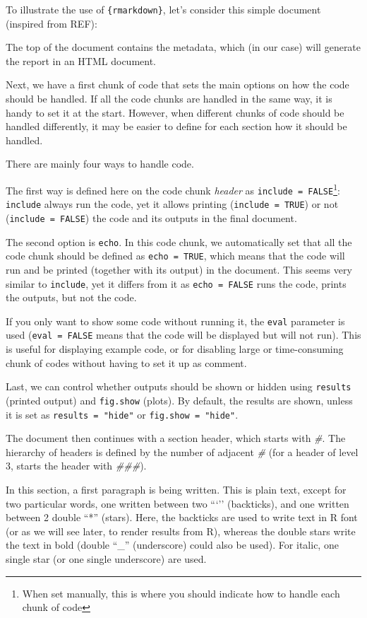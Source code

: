 \documentclass[
]{krantz}
\begin{document}
To illustrate the use of \texttt{\{rmarkdown\}}, let's consider this simple document (inspired from REF):

The top of the document contains the metadata, which (in our case) will generate the report in an HTML document.

Next, we have a first chunk of code that sets the main options on how the code should be handled. If all the code chunks are handled in the same way, it is handy to set it at the start. However, when different chunks of code should be handled differently, it may be easier to define for each section how it should be handled.

There are mainly four ways to handle code.

The first way is defined here on the code chunk \emph{header} as \texttt{include\ =\ FALSE}\footnote{When set manually, this is where you should indicate how to handle each chunk of code}: \texttt{include} always run the code, yet it allows printing (\texttt{include\ =\ TRUE}) or not (\texttt{include\ =\ FALSE}) the code and its outputs in the final document.

The second option is \texttt{echo}. In this code chunk, we automatically set that all the code chunk should be defined as \texttt{echo\ =\ TRUE}, which means that the code will run and be printed (together with its output) in the document. This seems very similar to \texttt{include}, yet it differs from it as \texttt{echo\ =\ FALSE} runs the code, prints the outputs, but not the code.

If you only want to show some code without running it, the \texttt{eval} parameter is used (\texttt{eval\ =\ FALSE} means that the code will be displayed but will not run). This is useful for displaying example code, or for disabling large or time-consuming chunk of codes without having to set it up as comment.

Last, we can control whether outputs should be shown or hidden using \texttt{results} (printed output) and \texttt{fig.show} (plots). By default, the results are shown, unless it is set as \texttt{results\ =\ "hide"} or \texttt{fig.show\ =\ "hide"}.

The document then continues with a section header, which starts with \emph{\#}. The hierarchy of headers is defined by the number of adjacent \emph{\#} (for a header of level 3, starts the header with \emph{\#\#\#}).

In this section, a first paragraph is being written. This is plain text, except for two particular words, one written between two ```'' (backticks), and one written between 2 double ``*'' (stars). Here, the backticks are used to write text in R font (or as we will see later, to render results from R), whereas the double stars write the text in bold (double ``\_'' (underscore) could also be used). For italic, one single star (or one single underscore) are used.
\end{document}
